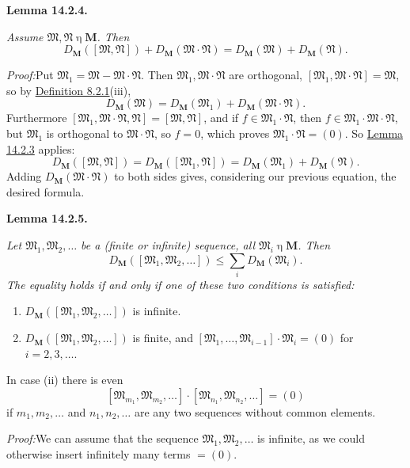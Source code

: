 \documentclass[12pt,b5paper,twoside]{article}
\newcommand{\M}{\mathbf M}
\newcommand{\Lemma}[1]{%
  \par\smallskip\noindent\phantomsection\label{lem:#1}\textbf{Lemma #1.}\enspace
}
\newcommand{\Proof}{\par\noindent\textit{Proof:}\enspace}
\newcommand{\defref}[1]{\hyperref[def:#1]{Definition #1}}
\newcommand{\lemref}[1]{\hyperref[lem:#1]{Lemma #1}}
\begin{document}
\Lemma{14.2.4}
{\itshape Assume \(\mathfrak M,\mathfrak N\mathbin\eta\M\). Then
\[
 D_{\M}([\mathfrak M,\mathfrak N])
 +D_{\M}(\mathfrak M\cdot\mathfrak N)
 =D_{\M}(\mathfrak M)+D_{\M}(\mathfrak N).
\]}

\Proof Put \(\mathfrak M_1=\mathfrak M-\mathfrak M\cdot\mathfrak N\).
Then \(\mathfrak M_1,\mathfrak M\cdot\mathfrak N\) are orthogonal,
\([\mathfrak M_1,\mathfrak M\cdot\mathfrak N]=\mathfrak M\), so by
\defref{8.2.1}(iii),
\[
D_{\M}(\mathfrak M)=D_{\M}(\mathfrak M_1)
 +D_{\M}(\mathfrak M\cdot\mathfrak N).
\]
Furthermore \([\mathfrak M_1,\mathfrak M\cdot\mathfrak N,\mathfrak N]
=[\mathfrak M,\mathfrak N]\), and if
\(f\in\mathfrak M_1\cdot\mathfrak N\), then
\(f\in\mathfrak M_1\cdot\mathfrak M\cdot\mathfrak N\), but
\(\mathfrak M_1\) is orthogonal to
\(\mathfrak M\cdot\mathfrak N\), so \(f=0\), which proves
\(\mathfrak M_1\cdot\mathfrak N=(0)\). So \lemref{14.2.3} applies:
\[
D_{\M}([\mathfrak M,\mathfrak N])
=D_{\M}([\mathfrak M_1,\mathfrak N])
=D_{\M}(\mathfrak M_1)+D_{\M}(\mathfrak N).
\]
Adding \(D_{\M}(\mathfrak M\cdot\mathfrak N)\) to both sides gives,
considering our previous equation, the desired formula.

\Lemma{14.2.5}
{\itshape Let \(\mathfrak M_1,\mathfrak M_2,\ldots\) be a (finite or
infinite) sequence, all \(\mathfrak M_i\mathbin\eta\M\). Then
\[
D_{\M}([\mathfrak M_1,\mathfrak M_2,\ldots])
 \leq\sum_iD_{\M}(\mathfrak M_i).
\]
The equality holds if and only if one of these two conditions is satisfied:
\begin{enumerate}[label=(\roman*)]
\item \(D_{\M}([\mathfrak M_1,\mathfrak M_2,\ldots])\) is infinite.
\item \(D_{\M}([\mathfrak M_1,\mathfrak M_2,\ldots])\) is finite, and
\([\mathfrak M_1,\ldots,\mathfrak M_{i-1}]\cdot\mathfrak M_i=(0)\) for
\(i=2,3,\ldots\).
\end{enumerate}
In case (ii) there is even
\[
[\mathfrak M_{m_1},\mathfrak M_{m_2},\ldots]
 \cdot[\mathfrak M_{n_1},\mathfrak M_{n_2},\ldots]=(0)
\]
if \(m_1,m_2,\ldots\) and \(n_1,n_2,\ldots\) are any two sequences without
common elements.}

\Proof We can assume that the sequence
\(\mathfrak M_1,\mathfrak M_2,\ldots\) is infinite, as we could otherwise
insert infinitely many terms \(=(0)\).
\end{document}
